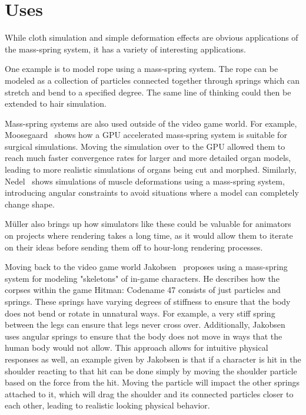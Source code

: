 \chapter{Uses}
While cloth simulation and simple deformation effects are obvious applications of the mass-spring system, 
it has a variety of interesting applications.

One example is to model rope using a mass-spring system. The rope can be modeled as a collection of particles
connected together through springs which can stretch and bend to a specified degree.
The same line of thinking could then be extended to hair simulation.

Mass-spring systems are also used outside of the video game world.
For example, Moosegaard~\cite{mosegaards_clothing_simulation} shows how a GPU accelerated mass-spring system is suitable for surgical simulations. 
Moving the simulation over to the GPU allowed them to reach much faster convergence rates for
larger and more detailed organ models, leading to more realistic simulations of organs being cut and morphed.
Similarly, Nedel~\cite{nedel_muscle_spring_mass} shows simulations of muscle deformations using a mass-spring system,
introducing angular constraints to avoid situations where a model can completely change shape.

Müller\cite{muller_fem} also brings up how simulators like these could be valuable for animators on projects where
rendering takes a long time, as it would allow them to iterate on their ideas before sending them off to hour-long rendering processes.

Moving back to the video game world Jakobsen~\cite{jakobsen_advanced_character_physics} proposes using a mass-spring system
for modeling "skeletons" of in-game characters. 
He describes how the corpses within the game Hitman: Codename 47 consists of just particles and springs.
These springs have varying degrees of stiffness to ensure that the body does not bend or rotate in unnatural ways.
For example, a very stiff spring between the legs can ensure that legs never cross over.
Additionally, Jakobsen uses angular springs to ensure that the body does not move in ways that the human body would not allow.
This approach allows for intuitive physical responses as well, an example given by Jakobsen is that if a character is hit in the shoulder
reacting to that hit can be done simply by moving the shoulder particle based on the force from the hit.
Moving the particle will impact the other springs attached to it, which will drag the shoulder and its connected particles closer to each other,
leading to realistic looking physical behavior.